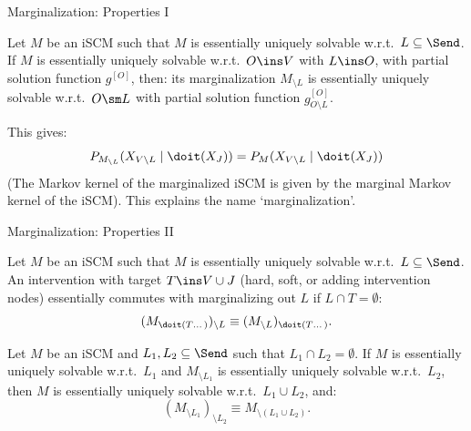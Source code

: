 \begin{frame}{Marginalization: Properties I}
  \begin{Lem}[\ref{lem:marginalization_preserves_unique_solvability}]
  Let $M$ be an iSCM such that $M$ is essentially uniquely solvable w.r.t.\ $L \subseteq \Send$.
  If $M$ is essentially uniquely solvable w.r.t.\ $O \ins V$ with $L \ins O$, with partial solution function $g^{[O]}$, then:
  its marginalization $M_{\setminus L}$ is essentially uniquely solvable w.r.t.\ $O \sm L$ with partial solution function
  $g^{[O]}_{O\setminus L}$.
\end{Lem}
This gives:
$$P_{M_{\setminus L}}(X_{V\setminus L} \mid \doit(X_J)) = P_{M}(X_{V\setminus L} \mid \doit(X_J))$$
(The Markov kernel of the marginalized iSCM is given by the marginal Markov kernel of the iSCM).
This explains the name `marginalization'.
\end{frame}
  
\begin{frame}{Marginalization: Properties II}
  \begin{Prp}[\ref{prp:interventions_marginalizations_commute}]
    Let $M$ be an iSCM such that $M$ is essentially uniquely solvable w.r.t.\ $L \subseteq \Send$.
    An intervention with target $T \ins V \cup J$ (hard, soft, or adding intervention nodes) essentially commutes with marginalizing out $L$ if $L \cap T = \emptyset$:
    $$(M_{\doit(T\dots)})_{\setminus L} \equiv (M_{\setminus L})_{\doit(T\dots)}.$$
\end{Prp}

\begin{Prp}[\ref{prp:marginalization_commutes}]
  Let $M$ be an iSCM and $L_1, L_2 \subseteq \Send$ such that $L_1 \cap L_2 = \emptyset$.
  If $M$ is essentially uniquely solvable w.r.t.\ $L_1$ and $M_{\setminus L_1}$ is essentially uniquely solvable w.r.t.\ $L_2$, then $M$ is essentially uniquely solvable w.r.t.\ $L_1 \cup L_2$, and:
  $$(M_{\setminus L_1})_{\setminus L_2} \equiv M_{\setminus (L_1\cup L_2)}.$$
\end{Prp}
\end{frame}

